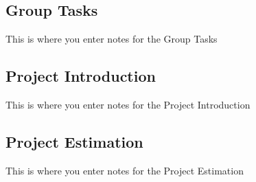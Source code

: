 \subsection{Group Tasks}
    This is where you enter notes for the Group Tasks
        
\subsection{Project Introduction}
    This is where you enter notes for the Project Introduction
    
\subsection{Project Estimation}
    This is where you enter notes for the Project Estimation